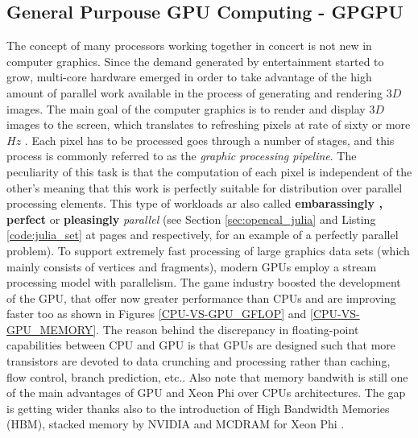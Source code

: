 \begin{description}
    \subsection{General Purpouse GPU Computing - GPGPU}
    The concept of many processors working together in concert is not new in computer graphics. Since the demand generated by entertainment started to grow, multi-core hardware emerged in order to take advantage of the high amount of parallel work available in the process of generating and rendering $3D$ images.
    The main goal of the computer graphics is to  render and display $3D$ images to the screen, which translates to refreshing pixels at rate of sixty or more $\si{Hz}$ \cite{Akenine-Moller:2002:RR:553838}. Each pixel has to be processed goes through a number of stages, and this process is commonly referred to as the \emph{graphic processing pipeline}. The peculiarity of this task is that the computation of each pixel is independent of the other's meaning that this work is perfectly suitable for distribution over parallel processing elements. This type of workloads ar also called \textbf{embarassingly , perfect} or \textbf{pleasingly} \textit{parallel} \cite{Foster:1995:DBP:527029} (see Section \ref{sec:opencal_julia} and Listing \ref{code:julia_set} at pages \pageref{sec:opencal_julia} and \pageref{code:julia_set} respectively, for an example of a perfectly parallel problem). To support extremely fast processing of large graphics data sets (which mainly consists of vertices and fragments), modern GPUs employ a stream processing model with parallelism.
    The game industry boosted the development of the GPU, that offer now greater
    performance than CPUs and are improving faster too  as shown in Figures
    \ref{CPU-VS-GPU_GFLOP} and \ref{CPU-VS-GPU_MEMORY}.
    The reason behind the discrepancy in floating-point capabilities between CPU and  GPU is that GPUs are designed such that more transistors are devoted to data crunching and processing rather than caching, flow control, branch prediction, etc..
    Also note that memory bandwith is still one of the main advantages of GPU and Xeon Phi over CPUs architectures. The gap is getting wider thanks also to the introduction of High Bandwidth Memories (HBM), stacked memory by NVIDIA and MCDRAM for Xeon Phi \cite{Sodani:7477467,Jun:7939084}. 
    

\end{description}
